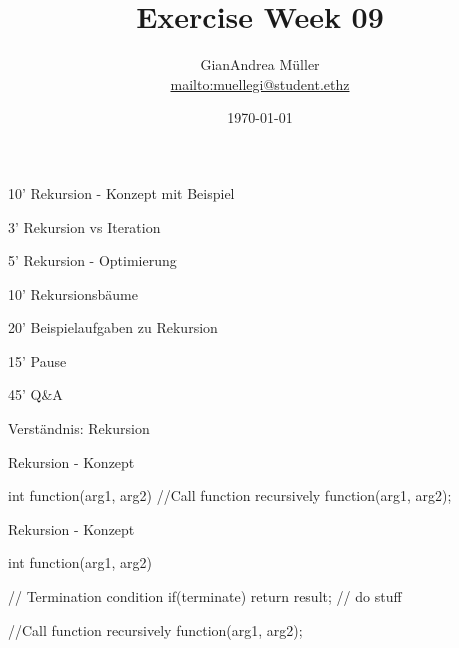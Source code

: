 \ifnum\conditionmacro=1 \documentclass[handout,usenames,dvipsnames]{beamer}\fi
\title{Exercise Week 09}
\author{GianAndrea Müller\\ \url{mailto:muellegi@student.ethz}}
\date{\today}
\begin{document}
\maketitle

\begin{TFTimeSchedule}
\item 10' Rekursion - Konzept mit Beispiel
\item 3' Rekursion vs Iteration
\item 5' Rekursion - Optimierung
\item 10' Rekursionsbäume
\item 20' Beispielaufgaben zu Rekursion
\item 15' Pause
\item 45' Q\&A
\end{TFTimeSchedule}

\begin{TFLearningObjectives}
\item Verständnis: Rekursion
\end{TFLearningObjectives}

\begin{frame}[fragile]{Rekursion - Konzept}
\begin{TFCpp}
int function(arg1, arg2){
	//Call function recursively
	function(arg1, arg2);	
}
\end{TFCpp}
\end{frame}


\begin{frame}[fragile]{Rekursion - Konzept}
\begin{TFCpp}
int function(arg1, arg2){
	// Termination condition	
	if(terminate){
		return result;
	}
	// do stuff
	
	//Call function recursively
	function(arg1, arg2);	
}
\end{TFCpp}
\end{frame}

\end{document}
